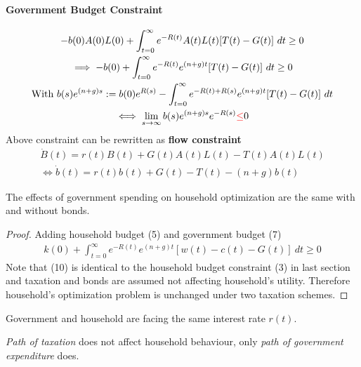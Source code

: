 \documentclass[11pt]{article}
\begin{document}
			\paragraph{Government Budget Constraint}
				\begin{gather}
					-b(0) A(0) L(0) + \int_{t=0}^\infty e^{-R(t)} A(t)L(t) [T(t) - G(t)]\ dt \geq 0 \\
					\implies -b(0) + \int_{t=0}^{\infty} e^{-R(t)} e^{(n+g)t} [T(t) - G(t)]\ dt \geq 0 \\
					\text{{With }}b(s)e^{(n+g)s} := b(0)e^{R(s)} - \int_{t=0}^{\infty} e^{-R(t)+R(s)} e^{(n+g)t} [T(t) - G(t)]\ dt\\
					\iff \lim_{s\to \infty} b(s) e^{(n+g)s} e^{-R(s)} \textcolor{red}{\leq} 0
				\end{gather}
				Above constraint can be rewritten as \textbf{flow constraint}
				\begin{gather}
					\dot{B}(t) = r(t)B(t) + G(t)A(t)L(t) -T(t)A(t)L(t) \\
					\iff \dot{b}(t) = r(t)b(t) + G(t) - T(t) - (n+g)b(t)
				\end{gather}
			\begin{proposition}
				The effects of government spending on household optimization are the same with and without bonds.
			\end{proposition}
				\begin{proof}
					Adding household budget (5) and government budget (7)
				\begin{gather}
					k(0) + \int_{t=0}^\infty {e^{-R(t)} e^{(n+g)t} [w(t) - c(t) - G(t)]}\ dt \geq 0
				\end{gather}
				Note that (10) is identical to the household budget constraint (3) in last section and taxation and bonds are assumed not affecting household's utility. Therefore household's optimization problem is unchanged under two taxation schemes.
				\end{proof}
				
			\begin{assumption}
				Government and household are facing the same interest rate $r(t)$.
			\end{assumption}
				
			\begin{proposition}
				\emph{Path of taxation} does not affect household behaviour, only \emph{path of government expenditure} does.
			\end{proposition}
			
\end{document}

